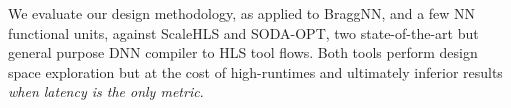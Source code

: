 We evaluate our design methodology, as applied to BraggNN, and a few NN functional units, against ScaleHLS\cite{ye2021scalehls} and SODA-OPT\cite{9516615}, two state-of-the-art but general purpose DNN compiler to HLS tool flows.
Both tools perform design space exploration but at the cost of high-runtimes and ultimately inferior results \emph{when latency is the only metric}.



